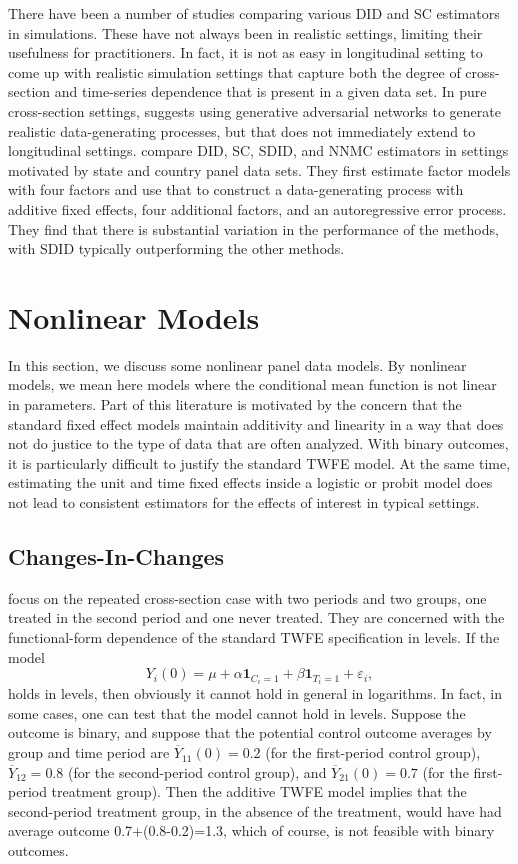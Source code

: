 \documentclass[letterpaper,12pt,leqno]{article}
\begin{document}
There have been a number of studies comparing various DID and SC  estimators in simulations.
These have not always been in realistic settings, limiting their usefulness for practitioners.
In fact, it is not as easy in longitudinal setting to come up with realistic simulation settings that capture both the degree of cross-section and time-series dependence that is present in a given data set. In pure cross-section settings, \cite{athey2021using} suggests using generative adversarial networks to generate realistic data-generating processes, but that does not immediately extend to longitudinal settings.
\cite{arkhangelsky2021synthetic}
compare DID, SC, SDID, and NNMC estimators in settings motivated by state and country panel data sets. They first estimate factor models with four factors and use that to construct a data-generating process with additive fixed effects, four additional factors, and an autoregressive error process. They find that there is substantial variation in the performance of the methods, with SDID typically outperforming the other methods.

\section{Nonlinear Models}\label{section:nonlinear}


In this section, we discuss some nonlinear panel data models. By nonlinear models, we mean here models where the conditional mean function is not linear in parameters. Part of this literature is motivated by the concern that the standard fixed effect models maintain additivity and linearity in a way that does not do justice to the type of data that are often analyzed. With binary outcomes, it is particularly difficult to justify the standard TWFE model. At the same time, estimating the unit and time fixed effects inside a logistic or probit model does not lead to consistent estimators for the effects of interest in typical settings.

\subsection{Changes-In-Changes}\label{cic}

\citep*{athey2006identification} focus on the repeated cross-section case with two periods and two groups, one treated in the second period and one never treated. They are concerned with the functional-form dependence of the standard TWFE specification in levels.
If the model \[ Y_{i}(0)=\mu+\alpha \mathbf{1}_{C_i=1}+\beta\mathbf{1}_{T_i=1}+\varepsilon_i,\]
holds in levels, then obviously it cannot hold in general in logarithms. In fact, in some cases, one can test that the model cannot hold in levels. Suppose the outcome is binary, and suppose that the potential control outcome averages by group and time period are $\overline{Y}_{11}(0)=0.2$ (for the first-period control group), $\overline{Y}_{12}=0.8$ (for the second-period control group), and $\overline{Y}_{21}(0)=0.7$ (for the first-period treatment group). Then the additive TWFE model implies that the second-period treatment group, in the absence of the treatment, would have had average outcome 0.7+(0.8-0.2)=1.3, which of course, is not feasible with binary outcomes.
\end{document}
